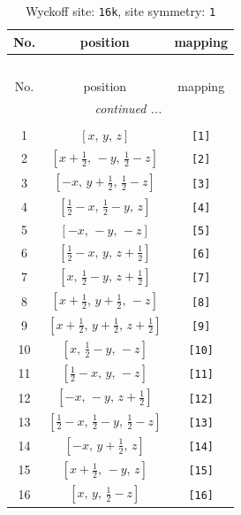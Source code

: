 \documentclass[fleqn,8pt]{jsarticle}
\begin{document}
\begin{longtable}{ccc}
\caption{Wyckoff site: {\tt 16k}, site symmetry: {\tt 1}}
 \\
 \hline \hline
No. & position & mapping \\ \hline \endfirsthead

\multicolumn{2}{l}{\tablename\ \thetable{}} \\
 \hline \hline
No. & position & mapping \\ \hline \endhead

 \hline \hline
\multicolumn{2}{r}{\footnotesize\it continued ...} \\ \endfoot

 \hline \hline
\multicolumn{2}{r}{} \\ \endlastfoot

1 & $\left[ x,\, y,\, z \right]$ & {\tt [1]} \\ \hline
2 & $\left[ x + \frac{1}{2},\, - y,\, \frac{1}{2} - z \right]$ & {\tt [2]} \\ \hline
3 & $\left[ - x,\, y + \frac{1}{2},\, \frac{1}{2} - z \right]$ & {\tt [3]} \\ \hline
4 & $\left[ \frac{1}{2} - x,\, \frac{1}{2} - y,\, z \right]$ & {\tt [4]} \\ \hline
5 & $\left[ - x,\, - y,\, - z \right]$ & {\tt [5]} \\ \hline
6 & $\left[ \frac{1}{2} - x,\, y,\, z + \frac{1}{2} \right]$ & {\tt [6]} \\ \hline
7 & $\left[ x,\, \frac{1}{2} - y,\, z + \frac{1}{2} \right]$ & {\tt [7]} \\ \hline
8 & $\left[ x + \frac{1}{2},\, y + \frac{1}{2},\, - z \right]$ & {\tt [8]} \\ \hline
9 & $\left[ x + \frac{1}{2},\, y + \frac{1}{2},\, z + \frac{1}{2} \right]$ & {\tt [9]} \\ \hline
10 & $\left[ x,\, \frac{1}{2} - y,\, - z \right]$ & {\tt [10]} \\ \hline
11 & $\left[ \frac{1}{2} - x,\, y,\, - z \right]$ & {\tt [11]} \\ \hline
12 & $\left[ - x,\, - y,\, z + \frac{1}{2} \right]$ & {\tt [12]} \\ \hline
13 & $\left[ \frac{1}{2} - x,\, \frac{1}{2} - y,\, \frac{1}{2} - z \right]$ & {\tt [13]} \\ \hline
14 & $\left[ - x,\, y + \frac{1}{2},\, z \right]$ & {\tt [14]} \\ \hline
15 & $\left[ x + \frac{1}{2},\, - y,\, z \right]$ & {\tt [15]} \\ \hline
16 & $\left[ x,\, y,\, \frac{1}{2} - z \right]$ & {\tt [16]} \\
\end{longtable}
\end{document}

